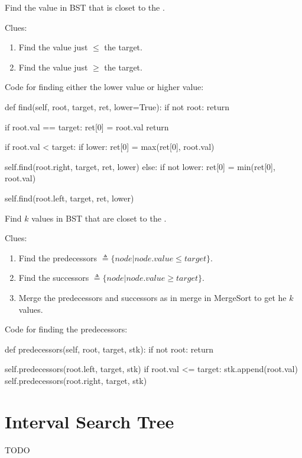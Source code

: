  Find the value in BST that is closet to the .

Clues:
\begin{enumerate}
\item Find the value just $\leq$ the target.
\item Find the value just $\geq$ the target.
\end{enumerate}

Code for finding either the lower value or higher value:
\begin{python}
def find(self, root, target, ret, lower=True):
  if not root:
    return

  if root.val == target:
    ret[0] = root.val
    return

  if root.val < target:
    if lower:
      ret[0] = max(ret[0], root.val)

    self.find(root.right, target, ret, lower)
  else:
    if not lower:
      ret[0] = min(ret[0], root.val)

    self.find(root.left, target, ret, lower)
\end{python}

 Find $k$ values in BST that are closet to the .

Clues:
\begin{enumerate}
\item Find the predecessors $\triangleq \{node | node.value \leq target\}$.
\item Find the successors $\triangleq \{node | node.value \geq target\}$.
\item Merge the predecessors and successors as in merge in MergeSort to get he $k$ values. 
\end{enumerate}

Code for finding the predecessors:
\begin{python}
def predecessors(self, root, target, stk):
  if not root:
    return

  self.predecessors(root.left, target, stk)
  if root.val <= target:
    stk.append(root.val)
    self.predecessors(root.right, target, stk)
\end{python}

\section{Interval Search Tree}
TODO


